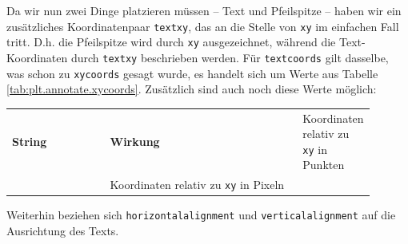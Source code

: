 Da wir nun zwei Dinge platzieren müssen -- Text und Pfeilspitze -- haben wir ein zusätzliches Koordinatenpaar \texttt{textxy}, das an die Stelle von \texttt{xy} im einfachen Fall tritt. D.\;h. die Pfeilspitze wird durch \texttt{xy} ausgezeichnet, während die Text-Koordinaten durch \texttt{textxy} beschrieben werden. Für \texttt{textcoords} gilt dasselbe, was schon zu \texttt{xycoords} gesagt wurde, \ie es handelt sich um Werte aus Tabelle \ref{tab:plt.annotate.xycoords}. Zusätzlich sind auch noch diese Werte möglich:
\begin{center}
\begin{tabular}{m{0.3\linewidth}m{0.6\linewidth}}
	\textbf{String}          & \textbf{Wirkung} \tabcrlf
	   & Koordinaten relativ zu \texttt{xy} in Punkten\\
	   & Koordinaten relativ zu \texttt{xy} in Pixeln\\
\end{tabular}
\end{center}
Weiterhin beziehen sich \texttt{horizontalalignment} und \texttt{verticalalignment} auf die Ausrichtung des Texts.

